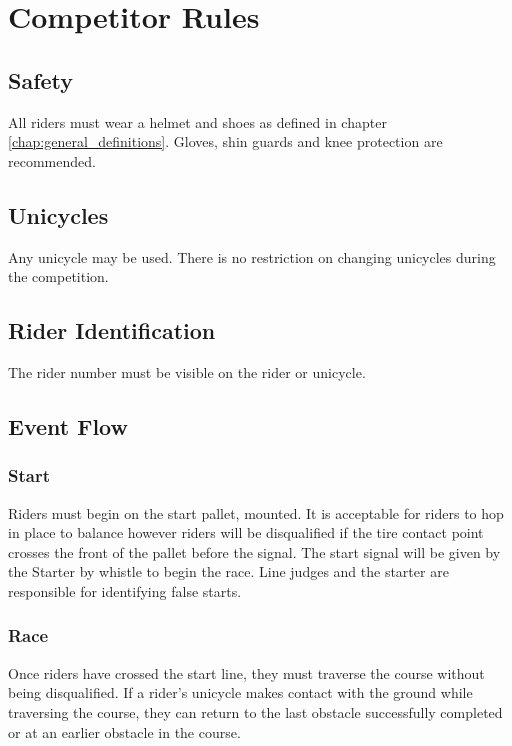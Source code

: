 \chapter{Competitor Rules}

\section{Safety}

All riders must wear a helmet and shoes as defined in chapter \ref{chap:general_definitions}.
Gloves, shin guards and knee protection are recommended.

\section{Unicycles}

Any unicycle may be used.
There is no restriction on changing unicycles during the competition.

\section{Rider Identification}

The rider number must be visible on the rider or unicycle.

\section{Event Flow}

\subsection{Start}

Riders must begin on the start pallet, mounted.
It is acceptable for riders to hop in place to balance however riders will be disqualified if the tire contact point crosses the front of the pallet before the signal.
The start signal will be given by the Starter by whistle to begin the race.
Line judges and the starter are responsible for identifying false starts.

\subsection{Race}

Once riders have crossed the start line, they must traverse the course without being disqualified.
If a rider's unicycle makes contact with the ground while traversing the course, they can return to the last obstacle successfully completed or at an earlier obstacle in the course.

